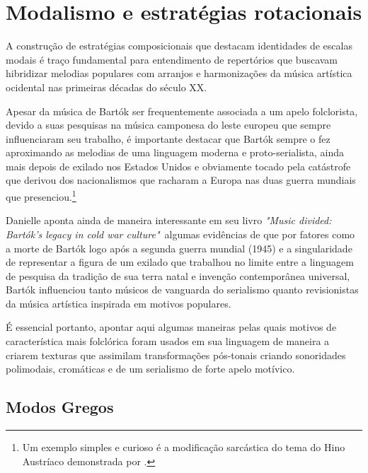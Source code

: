 \documentclass[
	12pt,				%
	openright,			%
	twoside,			%
	a4paper,			%
	english,			%
	french,				%
	spanish,			%
	brazil				%
	]{abntex2}
\begin{document}


\section{Modalismo e estratégias rotacionais}
\label{modalismo}

A construção de estratégias composicionais que destacam identidades de escalas modais é traço fundamental para entendimento de repertórios que buscavam hibridizar melodias populares com arranjos e harmonizações da música artística ocidental nas primeiras décadas do século XX. 

Apesar da música de Bartók ser frequentemente associada a um apelo folclorista, devido a suas pesquisas na música camponesa do leste europeu que sempre influenciaram seu trabalho, é importante destacar que Bartók sempre o fez aproximando as melodias de uma linguagem moderna e proto-serialista, ainda mais depois de exilado nos Estados Unidos e obviamente tocado pela catástrofe que derivou dos nacionalismos que racharam a Europa nas duas guerra mundiais que presenciou.\footnote{Um exemplo simples e curioso é a modificação sarcástica do tema do Hino Austríaco demonstrada por . }

Danielle  aponta ainda de maneira interessante em seu livro \textit{"Music divided: Bartók's legacy in cold war culture"}\ algumas evidências de que por fatores como a morte de Bartók logo após a segunda guerra mundial (1945) e a singularidade de representar a figura de um exilado que trabalhou no limite entre a linguagem de pesquisa da tradição de sua terra natal e invenção contemporânea universal, Bartók influenciou tanto músicos de vanguarda do serialismo quanto revisionistas da música artística inspirada em motivos populares.

É essencial portanto, apontar aqui algumas maneiras pelas quais motivos de característica mais folclórica foram usados em sua linguagem de maneira a criarem texturas que assimilam transformações pós-tonais criando sonoridades polimodais, cromáticas e de um serialismo de forte apelo motívico.

\subsection{Modos Gregos}
\end{document}
